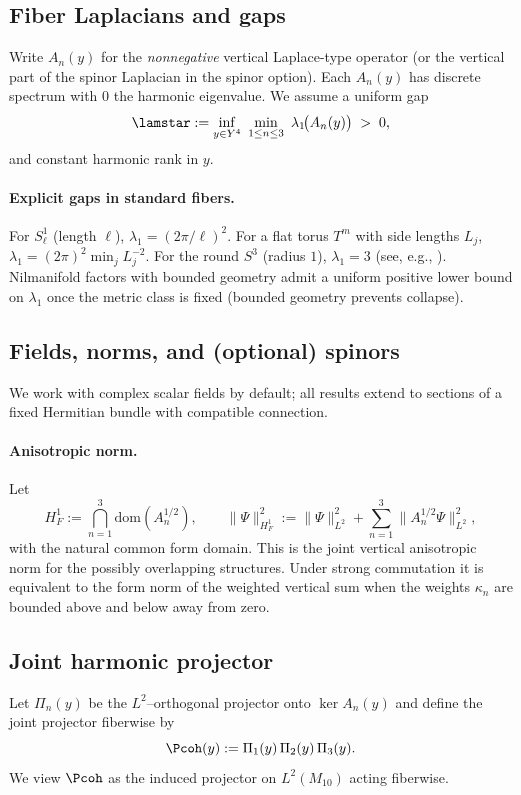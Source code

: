\documentclass[11pt]{article}
\newcommand{\Mten}{\ensuremath{M_{10}}}
\newcommand{\Yfour}{\ensuremath{Y^{4}}}
\newcommand{\HoneF}{\ensuremath{H^{1}_{F}}}
\newcommand{\Ltwo}{\ensuremath{L^{2}}}
\begin{document}
\subsection{Fiber Laplacians and gaps}
Write $A_n(y)$ for the \emph{nonnegative} vertical Laplace-type operator
(or the vertical part of the spinor Laplacian in the spinor option). Each $A_n(y)$
has discrete spectrum with $0$ the harmonic eigenvalue. We assume a uniform gap
\begin{equation}\label{eq:gap}
\lamstar := \inf_{y\in \Yfour}\ \min_{1\le n\le 3}\ \lambda_1\!\big(A_n(y)\big) \;>\;0,
\end{equation}
and constant harmonic rank in $y$.

\paragraph{Explicit gaps in standard fibers.}
For $S^1_\ell$ (length $\ell$), $\lambda_1=(2\pi/\ell)^2$.
For a flat torus $T^m$ with side lengths $L_j$, $\lambda_1=(2\pi)^2\min_j L_j^{-2}$.
For the round $S^3$ (radius $1$), $\lambda_1=3$ (see, e.g., \cite{Chavel1984}).
Nilmanifold factors with bounded geometry admit a uniform positive lower bound on $\lambda_1$
once the metric class is fixed (bounded geometry prevents collapse).

\subsection{Fields, norms, and (optional) spinors}
We work with complex scalar fields by default; all results extend to sections of a fixed
Hermitian bundle with compatible connection.

\paragraph{Anisotropic norm.}
Let
\[
\HoneF := \bigcap_{n=1}^3\mathrm{dom}(A_n^{1/2}),
\qquad
\|\Psi\|_{\HoneF}^{2}:=\|\Psi\|_{\Ltwo}^{2}
+\sum_{n=1}^3\|A_n^{1/2}\Psi\|_{\Ltwo}^{2},
\]
with the natural common form domain. This is the joint vertical anisotropic
norm for the possibly overlapping structures. Under strong commutation it is
equivalent to the form norm of the weighted vertical sum when the weights
$\kappa_n$ are bounded above and below away from zero.

\subsection{Joint harmonic projector}
Let $\Pi_n(y)$ be the $\Ltwo$--orthogonal projector onto $\ker A_n(y)$ and define
the joint projector fiberwise by
\[
\Pcoh(y) := \Pi_1(y)\,\Pi_2(y)\,\Pi_3(y).
\]
We view $\Pcoh$ as the induced projector on $\Ltwo(\Mten)$ acting fiberwise.
\end{document}
